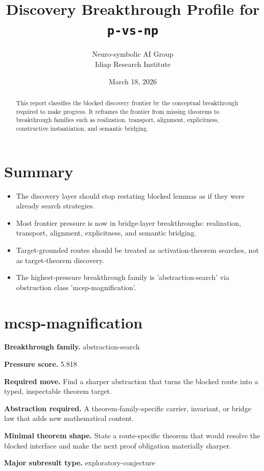 \documentclass[11pt]{article}
\title{Discovery Breakthrough Profile for \texttt{p-vs-np}}
\author{Neuro-symbolic AI Group\\Idiap Research Institute}
\date{March 18, 2026}
\begin{document}
\maketitle

\begin{abstract}
This report classifies the blocked discovery frontier by the conceptual breakthrough required to make progress. It reframes the frontier from missing theorems to breakthrough families such as realization, transport, alignment, explicitness, constructive instantiation, and semantic bridging.
\end{abstract}

\section{Summary}
\begin{itemize}[leftmargin=*,itemsep=0.2em]
\item The discovery layer should stop restating blocked lemmas as if they were already search strategies.
\item Most frontier pressure is now in bridge-layer breakthroughs: realization, transport, alignment, explicitness, and semantic bridging.
\item Target-grounded routes should be treated as activation-theorem searches, not as target-theorem discovery.
\item The highest-pressure breakthrough family is 'abstraction-search' via obstruction class 'mcsp-magnification'.
\end{itemize}

\section{mcsp-magnification}
\textbf{Breakthrough family.} abstraction-search

\textbf{Pressure score.} 5.818

\textbf{Required move.} Find a sharper abstraction that turns the blocked route into a typed, inspectable theorem target.

\textbf{Abstraction required.} A theorem-family-specific carrier, invariant, or bridge law that adds new mathematical content.

\textbf{Minimal theorem shape.} State a route-specific theorem that would resolve the blocked interface and make the next proof obligation materially sharper.

\textbf{Major subresult type.} exploratory-conjecture
\end{document}
